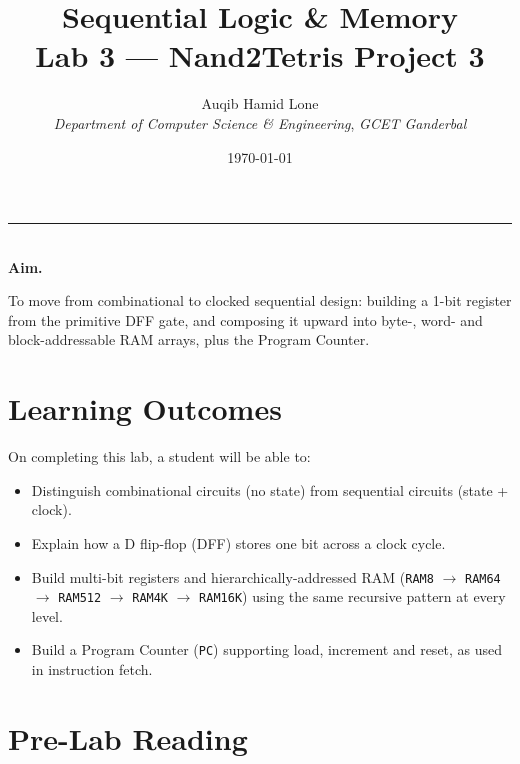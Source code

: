 \documentclass[11pt]{article}
\title{Sequential Logic \& Memory\\\large Lab 3 --- Nand2Tetris Project 3}
\author{Auqib Hamid Lone\\[0.3em]
  \emph{Department of Computer Science \& Engineering}, \emph{GCET Ganderbal}}
\date{\today}
\newenvironment{aimbox}{%
  \par\noindent\begin{minipage}{\linewidth}\vspace{0.4em}
  \textcolor{primary-blue}{\rule{\linewidth}{0.8pt}}\\[0.3em]
  \textbf{\textcolor{primary-blue}{Aim.}}\ \itshape
}{%
  \end{minipage}\vspace{0.4em}\par
}
\begin{document}
\maketitle

\begin{aimbox}
To move from combinational to clocked sequential design: building a 1-bit register from the primitive DFF gate, and composing it upward into byte-, word- and block-addressable RAM arrays, plus the Program Counter.
\end{aimbox}

\section{Learning Outcomes}

On completing this lab, a student will be able to:
\begin{itemize}
  \item Distinguish combinational circuits (no state) from sequential circuits (state + clock).
  \item Explain how a D flip-flop (DFF) stores one bit across a clock cycle.
  \item Build multi-bit registers and hierarchically-addressed RAM (\texttt{RAM8} $\to$ \texttt{RAM64} $\to$ \texttt{RAM512} $\to$ \texttt{RAM4K} $\to$ \texttt{RAM16K}) using the same recursive pattern at every level.
  \item Build a Program Counter (\texttt{PC}) supporting load, increment and reset, as used in instruction fetch.
\end{itemize}

\section{Pre-Lab Reading}
\end{document}
